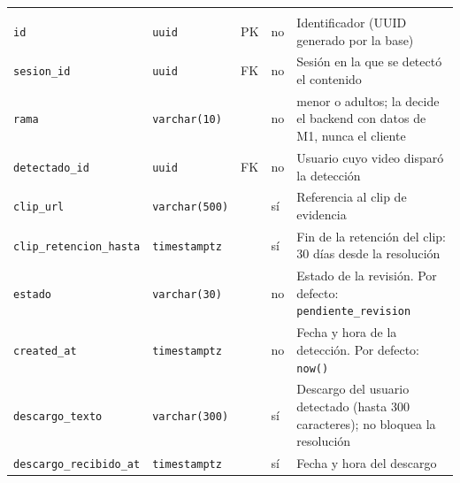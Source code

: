 {\small
\begin{xltabular}{\textwidth}{@{}>{\raggedright\arraybackslash}p{3.6cm} >{\raggedright\arraybackslash}p{2.3cm} >{\raggedright\arraybackslash}p{1cm} >{\centering\arraybackslash}p{0.85cm} L@{}}
    \toprule
     &  &  &  &  \\
    \midrule
    \endfirsthead
    \toprule
     &  &  &  &  \\
    \midrule
    \endhead
    \bottomrule
    \endfoot
    \texttt{id} & \texttt{uuid} & PK & no & Identificador (UUID generado por la base) \\
    \texttt{sesion\_\allowbreak{}id} & \texttt{uuid} & FK & no & Sesión en la que se detectó el contenido \\
    \texttt{rama} & \texttt{varchar(\allowbreak{}10)} &  & no & menor o adultos; la decide el backend con datos de M1, nunca el cliente \\
    \texttt{detectado\_\allowbreak{}id} & \texttt{uuid} & FK & no & Usuario cuyo video disparó la detección \\
    \texttt{clip\_\allowbreak{}url} & \texttt{varchar(\allowbreak{}500)} &  & sí & Referencia al clip de evidencia \\
    \texttt{clip\_\allowbreak{}retencion\_\allowbreak{}hasta} & \texttt{timestamptz} &  & sí & Fin de la retención del clip: 30 días desde la resolución \\
    \texttt{estado} & \texttt{varchar(\allowbreak{}30)} &  & no & Estado de la revisión. Por defecto: \texttt{\textquotesingle{}pendiente\_\allowbreak{}revision\textquotesingle{}} \\
    \texttt{created\_\allowbreak{}at} & \texttt{timestamptz} &  & no & Fecha y hora de la detección. Por defecto: \texttt{now(\allowbreak{})} \\
    \texttt{descargo\_\allowbreak{}texto} & \texttt{varchar(\allowbreak{}300)} &  & sí & Descargo del usuario detectado (hasta 300 caracteres); no bloquea la resolución \\
    \texttt{descargo\_\allowbreak{}recibido\_\allowbreak{}at} & \texttt{timestamptz} &  & sí & Fecha y hora del descargo \\
\end{xltabular}
}

